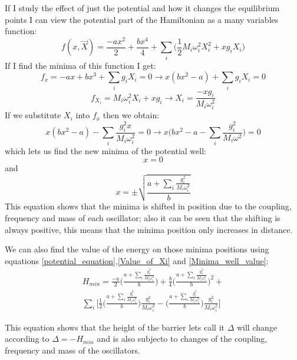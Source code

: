 \documentclass[idxtotoc,hyperref,openany]{labbook} %
\begin{document}
If I study the effect of just the potential and how it changes the equilibrium points I can view the potential part of the Hamiltonian as a many variables function:
\begin{equation}
f(x,\vec{X})=\frac{-ax^2}{2}+\frac{bx^4}{4}+\sum_i \Big( \frac{1}{2}M_i\omega_i^2X_i^2+xg_iX_i\Big)
\label{potential_equation}
\end{equation}
If I find the minima of this function I get:
\begin{equation}
f_x=-ax+bx^3+\sum_i g_iX_i=0 \rightarrow x(bx^2-a)+\sum_i g_iX_i=0 

\end{equation}
\begin{equation}
f_{X_i}=M_i\omega_i^2 X_i +xg_i \rightarrow X_i=\frac{-xg_i}{M_i\omega_i^2}
\label{Value_of_Xi}
\end{equation}
If we substitute $X_i$ into  $f_x$ then we obtain:
\begin{equation}
x(bx^2-a)-\sum_i \frac{g_i^2x}{M_i\omega_i^2}=0\rightarrow x\Big(bx^2-a-\sum_i \frac{g_i^2}{M_i\omega^2}\Big)=0
\end{equation}
which lets us find the new minima of the potential well:
\begin{equation}
x=0
\end{equation}
and 
\begin{equation}
x=\pm \sqrt{\frac{a+\sum_i \frac{g_i^2}{M_i\omega_i^2}}{b}}
\label{Minima_well_value}
\end{equation}
This equation shows that the minima is shifted in position due to the coupling, frequency and mass of each oscillator; also it can be seen that the shifting is always positive, this means that the minima position only increases in distance.

We can also find the value of the energy on those minima positions using equations \ref{potential_equation},\ref{Value_of_Xi} and \ref{Minima_well_value}:
\begin{eqnarray}
H_{min}=\frac{-a}{2} \Bigg(\frac{a+\sum_i \frac{g_i^2}{M_i\omega_i^2}}{b} \Bigg) +\frac{b}{4} \Bigg(\frac{a+\sum_i \frac{g_i^2}{M_i\omega_i^2}}{b} \Bigg)^2+\\
\sum_i \Bigg[\frac{1}{2} \Bigg(\frac{a+\sum_i \frac{g_i^2}{M_i\omega_i^2}}{b} \Bigg)\frac{g_i^2}{M_i\omega_i^2}- \Bigg(\frac{a+\sum_i \frac{g_i^2}{M_i\omega_i^2}}{b} \Bigg)\frac{g_i^2}{M_i\omega_i^2} \Bigg]
\end{eqnarray}

This equation shows that the height of the barrier lets call it $\Delta$ will change according to $\Delta=-H_{min}$ and is also subjecto to changes of the coupling, frequency and mass of the oscillators.
\end{document}
